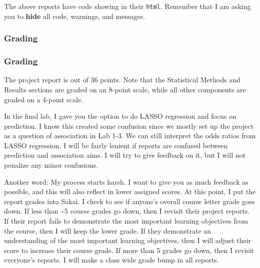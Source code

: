 \documentclass[
  letterpaper,
  DIV=11,
  numbers=noendperiod]{scrartcl}
\begin{document}
The above reports have code showing in their \texttt{html}. Remember
that I am asking you to \textbf{hide} all code, warnings, and messages.

\subsubsection{Grading}\label{grading}

\subsubsection{Grading}

The project report is out of 36 points. Note that the Statistical
Methods and Results sections are graded on an 8-point scale, while all
other components are graded on a 4-point scale.

\begin{tcolorbox}[enhanced jigsaw, colback=white, bottomrule=.15mm, colframe=quarto-callout-important-color-frame, toptitle=1mm, leftrule=.75mm, arc=.35mm, colbacktitle=quarto-callout-important-color!10!white, coltitle=black, left=2mm, bottomtitle=1mm, titlerule=0mm, breakable, opacitybacktitle=0.6, rightrule=.15mm, toprule=.15mm, title=\textcolor{quarto-callout-important-color}{\faExclamation}\hspace{0.5em}{Some words on my grading process}, opacityback=0]

In the final lab, I gave you the option to do LASSO regression and focus
on prediction. I know this created some confusion since we mostly set up
the project as a question of association in Lab 1-3. We can still
interpret the odds ratios from LASSO regression. I will be fairly
lenient if reports are confused between prediction and association aims.
I will try to give feedback on it, but I will not penalize any minor
confusions.

Another word: My process starts harsh. I want to give you as much
feedback as possible, and this will also reflect in lower assigned
scores. At this point, I put the report grades into Sakai. I check to
see if anyone's overall course letter grade goes down. If less than
\textasciitilde5 course grades go down, then I revisit their project
reports. If their report fails to demonstrate the most important
learning objectives from the course, then I will keep the lower grade.
If they demonstrate an understanding of the most important learning
objectives, then I will adjust their score to increase their course
grade. If more than 5 grades go down, then I revisit everyone's reports.
I will make a class wide grade bump in all reports.

\end{tcolorbox}
\end{document}
